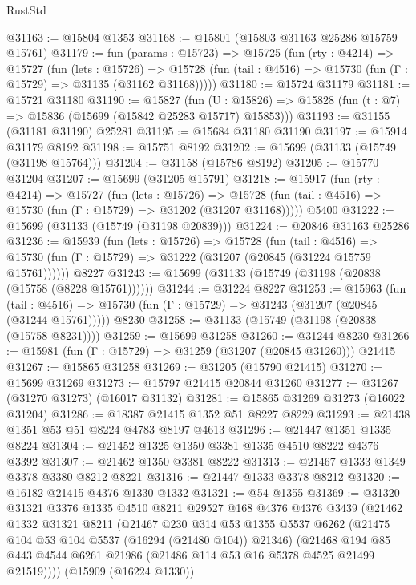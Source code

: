 \begin{lexlean}{RustStd}
\begin{coremodule}
@31163 := @15804 @1353
@31168 := @15801 (@15803 @31163 @25286 @15759 @15761)
@31179 := fun (params : @15723) =>
  @15725
    (fun (rty : @4214) =>
    @15727
      (fun (lets : @15726) =>
      @15728 (fun (tail : @4516) => @15730 (fun (Γ : @15729) => @31135 (@31162 @31168)))))
@31180 := @15724 @31179
@31181 := @15721 @31180
@31190 := @15827
    (fun (U : @15826) => @15828 (fun (t : @7) => @15836 (@15699 (@15842 @25283 @15717) @15853)))
@31193 := @31155 (@31181 @31190) @25281
@31195 := @15684 @31180 @31190
@31197 := @15914 @31179 @8192
@31198 := @15751 @8192
@31202 := @15699 (@31133 (@15749 (@31198 @15764)))
@31204 := @31158 (@15786 @8192)
@31205 := @15770 @31204
@31207 := @15699 (@31205 @15791)
@31218 := @15917
    (fun (rty : @4214) =>
    @15727
      (fun (lets : @15726) =>
      @15728 (fun (tail : @4516) => @15730 (fun (Γ : @15729) => @31202 (@31207 @31168)))))
    @5400
@31222 := @15699 (@31133 (@15749 (@31198 @20839)))
@31224 := @20846 @31163 @25286
@31236 := @15939
    (fun (lets : @15726) =>
    @15728
      (fun (tail : @4516) =>
      @15730 (fun (Γ : @15729) => @31222 (@31207 (@20845 (@31224 @15759 @15761))))))
    @8227
@31243 := @15699 (@31133 (@15749 (@31198 (@20838 (@15758 (@8228 @15761))))))
@31244 := @31224 @8227
@31253 := @15963
    (fun (tail : @4516) => @15730 (fun (Γ : @15729) => @31243 (@31207 (@20845 (@31244 @15761)))))
    @8230
@31258 := @31133 (@15749 (@31198 (@20838 (@15758 @8231))))
@31259 := @15699 @31258
@31260 := @31244 @8230
@31266 := @15981 (fun (Γ : @15729) => @31259 (@31207 (@20845 @31260))) @21415
@31267 := @15865 @31258
@31269 := @31205 (@15790 @21415)
@31270 := @15699 @31269
@31273 := @15797 @21415 @20844 @31260
@31277 := @31267 (@31270 @31273) (@16017 @31132)
@31281 := @15865 @31269 @31273 (@16022 @31204)
@31286 := @18387 @21415 @1352 @51 @8227 @8229
@31293 := @21438 @1351 @53 @51 @8224 @4783 @8197 @4613
@31296 := @21447 @1351 @1335 @8224
@31304 := @21452 @1325 @1350 @3381 @1335 @4510 @8222 @4376 @3392
@31307 := @21462 @1350 @3381 @8222
@31313 := @21467 @1333 @1349 @3378 @3380 @8212 @8221
@31316 := @21447 @1333 @3378 @8212
@31320 := @16182 @21415 @4376 @1330 @1332
@31321 := @54 @1355
@31369 := @31320
    @31321
    @3376
    @1335
    @4510
    @8211
    @29527
    @168
    @4376
    @4376
    @3439
    (@21462
      @1332
      @31321
      @8211
      (@21467
        @230
        @314
        @53
        @1355
        @5537
        @6262
        (@21475 @104 @53 @104 @5537 (@16294 (@21480 @104)) @21346)
        (@21468 @194 @85 @443 @4544 @6261 @21986 (@21486 @114 @53 @16 @5378 @4525 @21499 @21519))))
    (@15909 (@16224 @1330))

\end{coremodule}
\end{lexlean}
